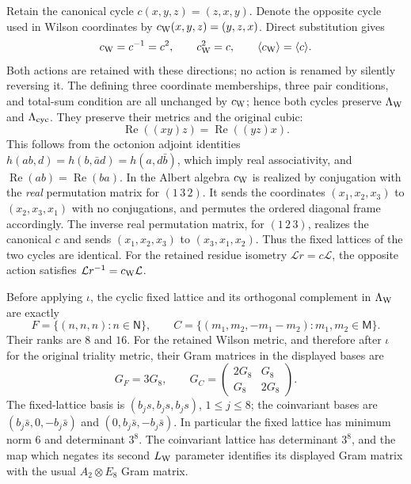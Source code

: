 Retain the canonical cycle $c(x,y,z)=(z,x,y)$. Denote the opposite
cycle used in Wilson coordinates by $c_{\rm W}(x,y,z)=(y,z,x)$.
Direct substitution gives
\[
 c_{\rm W}=c^{-1}=c^2,\qquad c_{\rm W}^2=c,\qquad
 \langle c_{\rm W}\rangle=\langle c\rangle.
\]
Both actions are retained with these directions; no action is renamed
by silently reversing it.
The defining three coordinate memberships, three pair conditions,
and total-sum condition are all unchanged by $c_{\rm W}$; hence both cycles preserve
$\Lambda_{\rm W}$ and $\Lambda_{\rm cyc}$. They preserve their metrics
and the original cubic:
\[
 \operatorname{Re}((xy)z)=\operatorname{Re}((yz)x).
\]
This follows from the octonion adjoint identities
$h(ab,d)=h(b,\bar a d)=h(a,d\bar b)$, which imply real associativity,
and $\operatorname{Re}(ab)=\operatorname{Re}(ba)$.
In the Albert algebra $c_{\rm W}$ is realized by conjugation with the
\emph{real} permutation matrix for $(1\,3\,2)$.
It sends the coordinates $(x_1,x_2,x_3)$ to $(x_2,x_3,x_1)$ with no
conjugations, and permutes the ordered diagonal frame accordingly.
The inverse real permutation matrix, for $(1\,2\,3)$, realizes the
canonical $c$ and sends $(x_1,x_2,x_3)$ to $(x_3,x_1,x_2)$.
Thus the fixed lattices of the two cycles are identical. For the
retained residue isometry $\mathcal Lr=c\mathcal L$, the opposite
action satisfies $\mathcal Lr^{-1}=c_{\rm W}\mathcal L$.

\begin{theorem}\label{wcl:thm:fixed-coinvariant}
Before applying $\iota$, the cyclic fixed lattice and its orthogonal
complement in $\Lambda_{\rm W}$ are exactly
\[
 F=\{(n,n,n):n\in\mathsf N\},\qquad
 C=\{(m_1,m_2,-m_1-m_2):m_1,m_2\in\mathsf M\}.
\]
Their ranks are $8$ and $16$. For the retained Wilson metric, and
therefore after $\iota$ for the original triality metric, their Gram
matrices in the displayed bases are
\begin{equation}
 G_F=3G_8,\qquad
 G_C=\begin{pmatrix}2G_8&G_8\\G_8&2G_8\end{pmatrix}.
 \label{wcl:eq:fixed-coinvariant-grams}
\end{equation}
The fixed-lattice basis is $(b_js,b_js,b_js)$, $1\le j\le8$;
the coinvariant bases are $(b_j\bar s,0,-b_j\bar s)$ and
$(0,b_j\bar s,-b_j\bar s)$. In particular the fixed lattice has
minimum norm $6$ and determinant $3^8$.
The coinvariant lattice has determinant $3^8$, and the map which
negates its second $L_{\rm W}$ parameter identifies its displayed
Gram matrix with the usual $A_2\otimes E_8$ Gram matrix.
\end{theorem}

